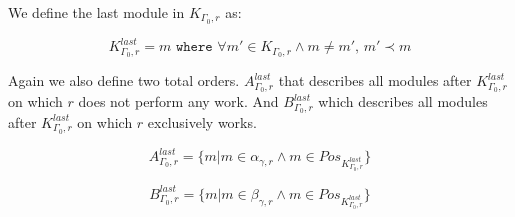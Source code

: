 We define the last module in $K_{\Gamma_0 ,r}$ as:

\[K_{\Gamma_0 ,r}^{last} = m \texttt{ where } \forall m' \in K_{\Gamma_0 ,r} \land m \neq m',\, m' \prec m \] 


Again we also define two total orders. $A_{\Gamma_0 ,r}^{last}$ that describes all modules after $K_{\Gamma_0 ,r}^{last}$ on which $r$ does not perform any work. And $B_{\Gamma_0 ,r}^{last}$ which describes all modules after $K_{\Gamma_0 ,r}^{last}$ on which $r$ exclusively works.


\[ A_{\Gamma_0 ,r}^{last} = \{m | m \in \alpha_{\gamma ,r}  \land m \in Pos_{K_{\Gamma_0 ,r}^{last}} \} \]

\[B_{\Gamma_0 ,r}^{last} = \{m | m \in \beta_{\gamma ,r}  \land m \in Pos_{K_{\Gamma_0 ,r}^{last}} \}\]






